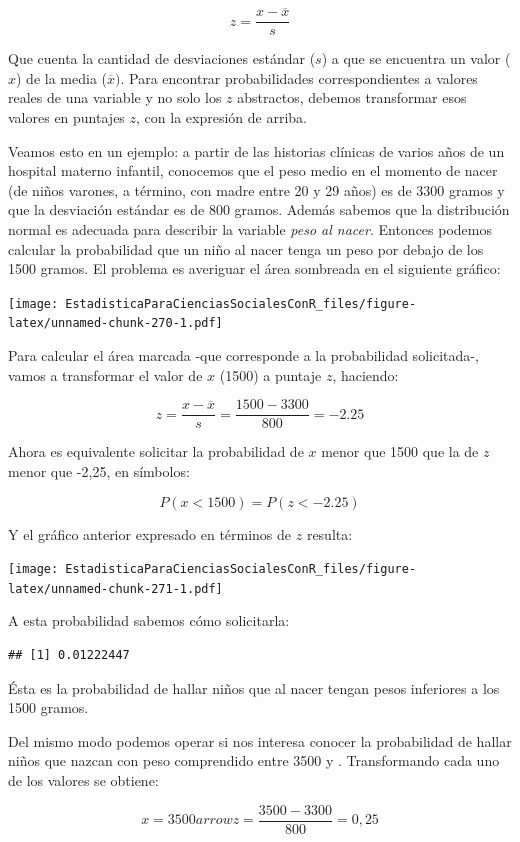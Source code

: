 \documentclass[]{book}
\begin{document}
\[z = \frac{x - \overline{x}}{s}\]

Que cuenta la cantidad de desviaciones estándar (\(s\)) a que se encuentra un valor (\(x\)) de la media (\(\overline{x})\). Para encontrar
probabilidades correspondientes a valores reales de una variable y no
solo los \(z\) abstractos, debemos transformar esos valores en puntajes
\(z\), con la expresión de arriba.

Veamos esto en un ejemplo: a partir de las historias clínicas de varios
años de un hospital materno infantil, conocemos que el peso medio en el
momento de nacer (de niños varones, a término, con madre entre 20 y 29
años) es de 3300 gramos y que la desviación estándar es de 800 gramos. Además sabemos que la distribución normal es adecuada para describir la variable \emph{peso al nacer}. Entonces podemos calcular la probabilidad que un niño al nacer tenga un peso por debajo de los 1500 gramos. El problema es averiguar el área sombreada en el siguiente gráfico:

\texttt{[image: EstadisticaParaCienciasSocialesConR\_files/figure-latex/unnamed-chunk-270-1.pdf]}

Para calcular el área marcada -que corresponde a la probabilidad
solicitada-, vamos a transformar el valor de \(x\) (1500) a puntaje \(z\),
haciendo:

\[z = \frac{x - \overline{x}}{s} = \frac{1500 - 3300}{800} = - 2.25\]

Ahora es equivalente solicitar la probabilidad de \(x\) menor que 1500 que la de \(z\) menor que -2,25, en símbolos:

\[P(x < 1500) = P(z < - 2.25)\]

Y el gráfico anterior expresado en términos de \(z\) resulta:

\texttt{[image: EstadisticaParaCienciasSocialesConR\_files/figure-latex/unnamed-chunk-271-1.pdf]}

A esta probabilidad sabemos cómo solicitarla:

\begin{verbatim}
## [1] 0.01222447
\end{verbatim}

Ésta es la probabilidad de hallar niños que al nacer tengan pesos
inferiores a los 1500 gramos.

Del mismo modo podemos operar si nos interesa conocer la probabilidad de hallar niños que nazcan con peso comprendido entre 3500 y .
Transformando cada uno de los valores se obtiene:

\[x = 3500arrow z = \frac{3500 - 3300}{800} = 0,25\]
\end{document}
